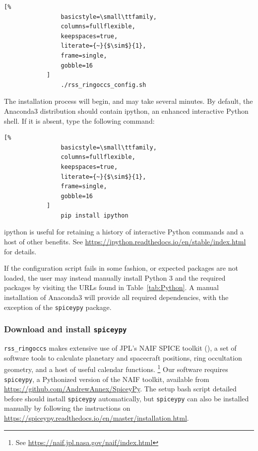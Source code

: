 \documentclass[titlepage, 12pt]{article}
\begin{document}
            \begin{lstlisting}[%
                basicstyle=\small\ttfamily,
                columns=fullflexible,
                keepspaces=true,
                literate={~}{$\sim$}{1},
                frame=single,
                gobble=16
            ]
                ./rss_ringoccs_config.sh
            \end{lstlisting}
            The installation process will begin,
            and may take several minutes. By default, the Anaconda3 distribution should contain ipython, an enhanced interactive Python shell. If it is absent, type the following command:
                        \begin{lstlisting}[%
                basicstyle=\small\ttfamily,
                columns=fullflexible,
                keepspaces=true,
                literate={~}{$\sim$}{1},
                frame=single,
                gobble=16
            ]
                pip install ipython
            \end{lstlisting}
            ipython is useful for retaining a history of interactive Python commands and a host of other benefits. See \url{https://ipython.readthedocs.io/en/stable/index.html} for details.
            
            \par\hfill\par
            If the configuration script fails in some fashion, or expected packages are not loaded,
            the user may instead manually install Python 3
            and the required packages by visiting the URLs found in
            Table~\ref{tab:Python}. A manual installation of 
            Anaconda3 will provide all required
            dependencies, with the exception of the \texttt{spiceypy}
            package.
            \subsubsection{Download and install \texttt{spiceypy}}
                \texttt{rss\_ringoccs} makes extensive
                use of JPL's NAIF SPICE toolkit
                (\citealt{Acton1996}), a set of software tools
                to calculate planetary and spacecraft positions,
                ring occultation geometry,
                and a host of useful calendar functions.%
                \footnote{See
                          \url{https://naif.jpl.nasa.gov/naif/index.html}}
                Our software requires \texttt{spiceypy},
                a Pythonized version of the NAIF toolkit, available from
                \url{https://github.com/AndrewAnnex/SpiceyPy}.
                The setup bash script detailed before should
                install \texttt{spiceypy} automatically, but \texttt{spiceypy} can also be installed manually by following the instructions on \url{https://spiceypy.readthedocs.io/en/master/installation.html}.
\end{document}
